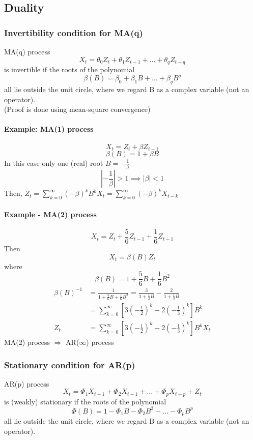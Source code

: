 \documentclass[11pt]{article}
\begin{document}
\subsection{Duality}
\subsubsection{Invertibility condition for MA(q)}
MA(q) process 
$$X_t = \theta_0Z_t + \theta_1Z_{t-1} + \hdots + \theta_qZ_{t-q}$$
is invertible if the roots of the polynomial
$$\beta(B) = \beta_0 + \beta_1B + \hdots + \beta_q B^q$$
all lie outside the unit circle, where we regard B as a complex variable (not an operator).\\
(Proof is done using mean-square convergence)
\paragraph{Example: MA(1) process}
$$X_t = Z_t + \beta Z_{t-1}$$
$$\beta(B) = 1 + \beta B$$
In this case only one (real) root $B = - \frac{1}{\beta}$
$$|-\frac{1}{\beta}| > 1 \implies |\beta| < 1$$
Then, $Z_t = \sum_{k=0}^\infty(-\beta)^kB^kX_t = \sum_{k=0}^\infty(-\beta)^kX_{t-k}$

\paragraph{Example - MA(2) process}
$$X_t = Z_t + \frac{5}{6}Z_{t-1} + \frac{1}{6}Z_{t-1}$$
Then
$$X_t = \beta(B)Z_t$$
where $$\beta(B) = 1 + \frac{5}{6}B + \frac{1}{6}B^2$$
\begin{align*}
	\beta(B)^{-1} &= \frac{1}{ 1 + \frac{5}{6}B + \frac{1}{6}B^2} = \frac{3}{1 + \frac{1}{2}B} - \frac{2}{1 + \frac{1}{3}B} \tag{two geometric series}\\
	&= \sum_{k=0}^\infty[3(-\frac{1}{2})^k - 2(-\frac{1}{3})^k]B^k\\
	Z_t &= \sum_{k=0}^\infty[3(-\frac{1}{2})^k - 2(-\frac{1}{3})^k]B^k X_t
\end{align*}
MA(2) process $\Rightarrow$ AR($\infty$) process
\subsubsection{Stationary condition for AR(p)}
AR(p) process $$X_t = \Phi_1X_{t-1} + \Phi_2 X_{t-1} + \hdots + \Phi_pX_{t-p} + Z_t$$
is (weakly) stationary if the roots of the polynomial
$$\Phi(B) = 1 - \Phi_1 B - \Phi_2 B^2 - \hdots - \Phi_p B^p$$
all lie outside the unit circle, where we regard B as a complex variable (not an operator).
\end{document}
